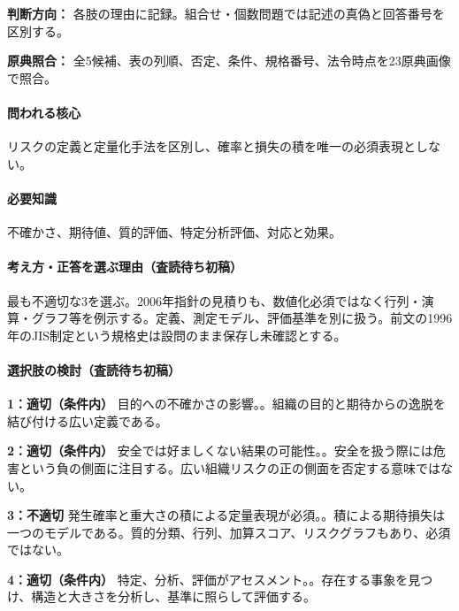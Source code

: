\noindent\textbf{判断方向：} 各肢の理由に記録。組合せ・個数問題では記述の真偽と回答番号を区別する。\par

\noindent\textbf{原典照合：} 全5候補、表の列順、否定、条件、規格番号、法令時点を23原典画像で照合。\par

\paragraph{問われる核心} リスクの定義と定量化手法を区別し、確率と損失の積を唯一の必須表現としない。

\paragraph{必要知識} 不確かさ、期待値、質的評価、特定分析評価、対応と効果。

\paragraph{考え方・正答を選ぶ理由（査読待ち初稿）} 最も不適切な3を選ぶ。2006年指針の見積りも、数値化必須ではなく行列・演算・グラフ等を例示する。定義、測定モデル、評価基準を別に扱う。前文の1996年のJIS制定という規格史は設問のまま保存し未確認とする。

\paragraph{選択肢の検討（査読待ち初稿）}\mbox{}\par

\noindent\textbf{1：適切（条件内）} 目的への不確かさの影響。。組織の目的と期待からの逸脱を結び付ける広い定義である。\par

\noindent\textbf{2：適切（条件内）} 安全では好ましくない結果の可能性。。安全を扱う際には危害という負の側面に注目する。広い組織リスクの正の側面を否定する意味ではない。\par

\noindent\textbf{3：不適切} 発生確率と重大さの積による定量表現が必須。。積による期待損失は一つのモデルである。質的分類、行列、加算スコア、リスクグラフもあり、必須ではない。\par

\noindent\textbf{4：適切（条件内）} 特定、分析、評価がアセスメント。。存在する事象を見つけ、構造と大きさを分析し、基準に照らして評価する。\par

